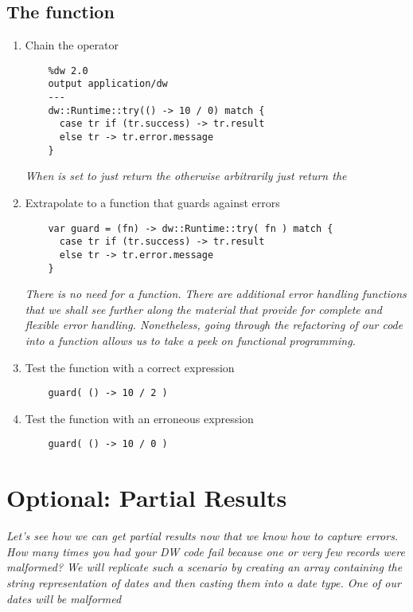 \begin{enumerate}[resume*]
\end{enumerate}
  
\subsection{The  function}
\begin{enumerate}[resume*]
\item Chain the  operator
  \begin{lstlisting}
    %dw 2.0
    output application/dw
    ---
    dw::Runtime::try(() -> 10 / 0) match {
      case tr if (tr.success) -> tr.result
      else tr -> tr.error.message
    }
  \end{lstlisting}
  \emph{
    When  is set to  just return the  otherwise arbitrarily just return the  
  }
\item Extrapolate to a function that guards against errors
  \begin{lstlisting}
    var guard = (fn) -> dw::Runtime::try( fn ) match {
      case tr if (tr.success) -> tr.result
      else tr -> tr.error.message
    }
  \end{lstlisting}
  \emph{
    There is no need for a  function.  There are additional error handling functions that we shall see further along the material that provide for complete and flexible error handling.  Nonetheless, going through the refactoring of our code into a function allows us to take a peek on functional programming.
  }
\item Test the  function with a correct expression
  \begin{lstlisting}
    guard( () -> 10 / 2 )
  \end{lstlisting}
\item Test the  function with an erroneous expression
  \begin{lstlisting}
    guard( () -> 10 / 0 )
  \end{lstlisting}  
\end{enumerate}


\section{Optional: Partial Results}
\emph{
  Let’s see how we can get partial results now that we know how to capture errors.
  How many times you had your DW code fail because one or very few records were malformed?
  We will replicate such a scenario by creating an array containing the string representation of dates and then casting them into a date type. One of our dates will be malformed
}

